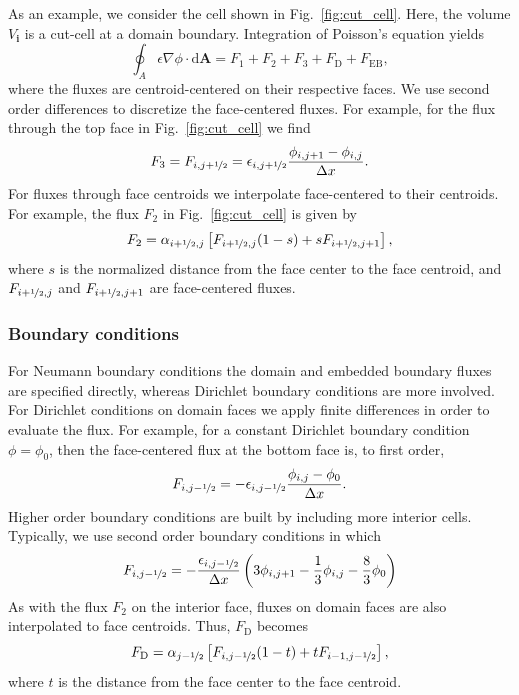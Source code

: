 \documentclass[3p]{elsarticle}
\def\diff{\ensuremath{\text{d}}}
\def\bmi{\ensuremath{\bm{i}}}
\begin{document}
As an example, we consider the cell shown in Fig.~\ref{fig:cut_cell}. Here, the volume $V_{\bmi}$ is a cut-cell at a domain boundary. Integration of Poisson's equation yields
\begin{equation}
  \oint_A \epsilon\nabla\phi\cdot\diff\bm{A} = F_1 + F_2 + F_3 + F_{\text{D}} + F_{\text{EB}},
\end{equation}
where the fluxes are centroid-centered on their respective faces. We use second order differences to discretize the face-centered fluxes. For example, for the flux through the top face in Fig.~\ref{fig:cut_cell} we find
\begin{equation}
  F_3 = F_{i,j+\nicefrac{1}{2}} = \epsilon_{i, j+\nicefrac{1}{2}}\frac{\phi_{i, j+1} - \phi_{i,j}}{\Delta x}.
\end{equation}
For fluxes through face centroids we interpolate face-centered to their centroids. For example, the flux $F_2$ in Fig.~\ref{fig:cut_cell} is given by
\begin{equation}
  F_2 = \alpha_{i+\nicefrac{1}{2}, j}\left[F_{i+\nicefrac{1}{2},j }(1-s) + sF_{i+\nicefrac{1}{2}, j+1}\right],
\end{equation}
where $s$ is the normalized distance from the face center to the face centroid, and $F_{i+\nicefrac{1}{2},j }$ and $F_{i+\nicefrac{1}{2}, j+1}$ are face-centered fluxes.

\subsubsection{Boundary conditions}
For Neumann boundary conditions the domain and embedded boundary fluxes are specified directly, whereas Dirichlet boundary conditions are more involved. For Dirichlet conditions on domain faces we apply finite differences in order to evaluate the flux. For example, for a constant Dirichlet boundary condition $\phi = \phi_0$, then the face-centered flux at the bottom face is, to first order,
\begin{equation}
  F_{i,j-\nicefrac{1}{2}} = -\epsilon_{i,j-\nicefrac{1}{2}}\frac{\phi_{i,j} - \phi_0}{\Delta x}. 
\end{equation}
Higher order boundary conditions are built by including more interior cells. Typically, we use second order boundary conditions in which
\begin{equation}
  F_{i,j-\nicefrac{1}{2}} = -\frac{\epsilon_{i,j-\nicefrac{1}{2}}}{\Delta x}\left(3\phi_{i,j+1} -\frac{1}{3}\phi_{i,j} - \frac{8}{3}\phi_0\right)
\end{equation}
As with the flux $F_2$ on the interior face, fluxes on domain faces are also interpolated to face centroids. Thus, $F_{\text{D}}$ becomes
\begin{equation}
  F_{\text{D}} = \alpha_{j-\nicefrac{1}{2}}\left[F_{i,j-\nicefrac{1}{2}}(1-t) + tF_{i-1,j-\nicefrac{1}{2}}\right],
\end{equation}
where $t$ is the distance from the face center to the face centroid.
\end{document}
